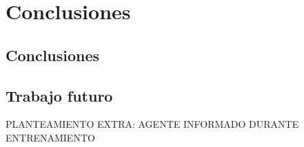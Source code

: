 \chapter{Conclusiones}

\section{Conclusiones}

\section{Trabajo futuro}

PLANTEAMIENTO EXTRA: AGENTE INFORMADO DURANTE ENTRENAMIENTO